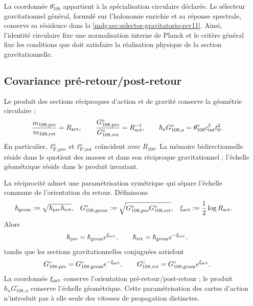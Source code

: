 La coordonnée \(\theta_{108}^{\circ}\) appartient à la spécialisation
circulaire déclarée. Le sélecteur gravitationnel général, formulé sur
l’holonomie enrichie et sa réponse spectrale, conserve sa résidence dans
la \cref{mdg:sec:selector-gravitatorio-rev11}. Ainsi, l’identité
circulaire fixe une normalisation interne de Planck et le critère général
fixe les conditions que doit satisfaire la réalisation physique de la
section gravitationnelle.

\subsection{Covariance pré-retour/post-retour}

Le produit des sections réciproques d’action et de gravité conserve la
géométrie circulaire :
\begin{equation}
 \frac{m_{108,\rm pre}}{m_{108,\rm ret}}=R_{\rm act},
 \qquad
 \frac{G_{108,\rm pre}^{\circ}}{G_{108,\rm ret}^{\circ}}
 =R_{\rm act}^{-1},
 \qquad
 \hbar_a G_{108,a}^{\circ}
 =\theta_{108}^{\circ}c_{\rm int}^{5}t_0^2.
 \label{mdg:eq:planck-ct108-covariancia-pre-ret-rev3}
\end{equation}
En particulier, \(\ell_{{\rm P},\rm pre}^{\circ}\) et
\(\ell_{{\rm P},\rm ret}^{\circ}\) coïncident avec \(R_{108}\). La mémoire
bidirectionnelle réside dans le quotient des masses et dans son réciproque
gravitationnel ; l’échelle géométrique réside dans le produit invariant.

La réciprocité admet une paramétrisation symétrique qui sépare l’échelle
commune de l’orientation du retour. Définissons
\begin{equation}
 \begin{aligned}
 \hbar_{\rm geom}
 &:=\sqrt{\hbar_{\rm pre}\hbar_{\rm ret}},
 &
 G_{108,\rm geom}^{\circ}
 &:=\sqrt{G_{108,\rm pre}^{\circ}G_{108,\rm ret}^{\circ}},
 &
 \xi_{\rm act}&:=\frac12\log R_{\rm act}.
 \end{aligned}
 \label{mdg:eq:planck-ct108-parametrizacion-simetrica-rev3}
\end{equation}
Alors
\[
 \hbar_{\rm pre}=\hbar_{\rm geom}e^{\xi_{\rm act}},
 \qquad
 \hbar_{\rm ret}=\hbar_{\rm geom}e^{-\xi_{\rm act}},
\]
tandis que les sections gravitationnelles conjuguées satisfont
\[
 G_{108,\rm pre}^{\circ}
 =G_{108,\rm geom}^{\circ}e^{-\xi_{\rm act}},
 \qquad
 G_{108,\rm ret}^{\circ}
 =G_{108,\rm geom}^{\circ}e^{\xi_{\rm act}}.
\]
La coordonnée \(\xi_{\rm act}\) conserve l’orientation
pré-retour/post-retour ; le produit \(\hbar_aG_{108,a}^{\circ}\)
conserve l’échelle géométrique. Cette paramétrisation des cartes d’action
n’introduit pas à elle seule des vitesses de propagation distinctes.

